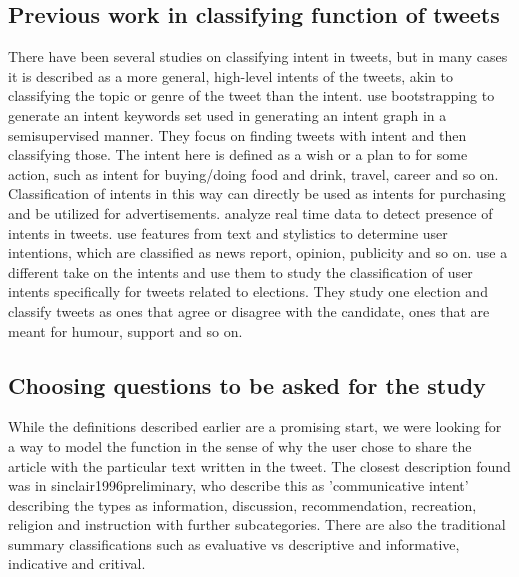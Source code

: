\subsection{Previous work in classifying function of tweets}
There have been several studies on classifying intent in tweets, but in many cases it is described as a more general, high-level intents of the tweets, akin to classifying the topic or genre of the tweet than the intent. \cite{wang2015mining} use bootstrapping to generate an intent keywords set used in generating an intent graph in a semisupervised manner. They focus on finding tweets with intent and then classifying those. The intent here is defined as a wish or a plan to for some action, such as intent for buying/doing food and drink, travel, career and so on. Classification of intents in this way can directly be used as intents for purchasing and be utilized for advertisements.  \citet{banerjee2012towards} analyze real time data to detect presence of intents in tweets. \citet{gomez2014content} use features from text and stylistics to determine user intentions, which are classified as news report, opinion, publicity and so on. \cite{mohammad2013identifying} use a different take on the intents and use them to study the classification of user intents specifically for tweets related to elections. They study one election and classify tweets as ones that agree or disagree with the candidate, ones that are meant for humour, support and so on. 


\subsection{Choosing questions to be asked for the study}

While the definitions described earlier are a promising start, we were looking for a way to model the function in the sense of why the user chose to share the article with the particular text written in the tweet. The closest description found was in {sinclair1996preliminary}, who describe this as 'communicative intent' describing the types as information, discussion, recommendation, recreation, religion and instruction with further subcategories. There are also the traditional summary classifications such as evaluative vs descriptive and informative, indicative and critival. 

